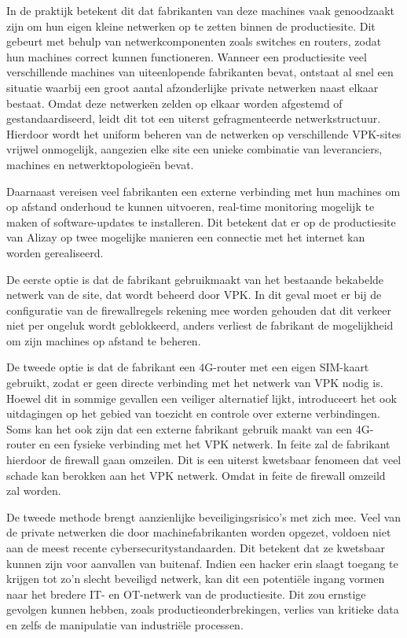 \vspace{5mm}
In de praktijk betekent dit dat fabrikanten van deze machines vaak genoodzaakt zijn om hun eigen kleine netwerken op te zetten binnen de productiesite. Dit gebeurt met behulp van netwerkcomponenten zoals switches en routers, zodat hun machines correct kunnen functioneren. Wanneer een productiesite veel verschillende machines van uiteenlopende fabrikanten bevat, ontstaat al snel een situatie waarbij een groot aantal afzonderlijke private netwerken naast elkaar bestaat. Omdat deze netwerken zelden op elkaar worden afgestemd of gestandaardiseerd, leidt dit tot een uiterst gefragmenteerde netwerkstructuur. Hierdoor wordt het uniform beheren van de netwerken op verschillende VPK-sites vrijwel onmogelijk, aangezien elke site een unieke combinatie van leveranciers, machines en netwerktopologieën bevat.

\vspace{5mm}
Daarnaast vereisen veel fabrikanten een externe verbinding met hun machines om op afstand onderhoud te kunnen uitvoeren, real-time monitoring mogelijk te maken of software-updates te installeren. Dit betekent dat er op de productiesite van Alizay op twee mogelijke manieren een connectie met het internet kan worden gerealiseerd. 

\vspace{5mm}
De eerste optie is dat de fabrikant gebruikmaakt van het bestaande bekabelde netwerk van de site, dat wordt beheerd door VPK. In dit geval moet er bij de configuratie van de firewallregels rekening mee worden gehouden dat dit verkeer niet per ongeluk wordt geblokkeerd, anders verliest de fabrikant de mogelijkheid om zijn machines op afstand te beheren.

\vspace{5mm}
De tweede optie is dat de fabrikant een 4G-router met een eigen SIM-kaart gebruikt, zodat er geen directe verbinding met het netwerk van VPK nodig is. Hoewel dit in sommige gevallen een veiliger alternatief lijkt, introduceert het ook uitdagingen op het gebied van toezicht en controle over externe verbindingen. Soms kan het ook zijn dat een externe fabrikant gebruik maakt van een 4G-router en een fysieke verbinding met het VPK netwerk. In feite zal de fabrikant hierdoor de firewall gaan omzeilen. Dit is een uiterst kwetsbaar fenomeen dat veel schade kan berokken aan het VPK netwerk. Omdat in feite de firewall omzeild zal worden.

\vspace{5mm}
De tweede methode brengt aanzienlijke beveiligingsrisico’s met zich mee. Veel van de private netwerken die door machinefabrikanten worden opgezet, voldoen niet aan de meest recente cybersecuritystandaarden. Dit betekent dat ze kwetsbaar kunnen zijn voor aanvallen van buitenaf. Indien een hacker erin slaagt toegang te krijgen tot zo’n slecht beveiligd netwerk, kan dit een potentiële ingang vormen naar het bredere IT- en OT-netwerk van de productiesite. Dit zou ernstige gevolgen kunnen hebben, zoals productieonderbrekingen, verlies van kritieke data en zelfs de manipulatie van industriële processen.
\vspace{5mm} 


